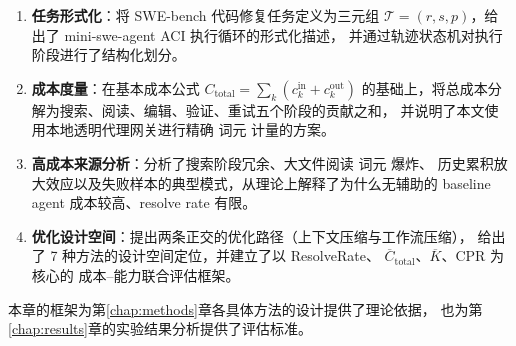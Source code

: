 \begin{enumerate}
  \item \textbf{任务形式化}：将 SWE-bench 代码修复任务定义为三元组
        $\mathcal{T} = (r, s, p)$，给出了 mini-swe-agent ACI 执行循环的形式化描述，
        并通过轨迹状态机对执行阶段进行了结构化划分。

  \item \textbf{成本度量}：在基本成本公式 $C_{\text{total}} = \sum_k (c_k^{\text{in}} + c_k^{\text{out}})$
        的基础上，将总成本分解为搜索、阅读、编辑、验证、重试五个阶段的贡献之和，
        并说明了本文使用本地透明代理网关进行精确 词元 计量的方案。

  \item \textbf{高成本来源分析}：分析了搜索阶段冗余、大文件阅读 词元 爆炸、
        历史累积放大效应以及失败样本的典型模式，从理论上解释了为什么无辅助的
        baseline agent 成本较高、resolve rate 有限。

  \item \textbf{优化设计空间}：提出两条正交的优化路径（上下文压缩与工作流压缩），
        给出了 7 种方法的设计空间定位，并建立了以 ResolveRate、
        $\overline{C}_{\text{total}}$、$\overline{K}$、CPR 为核心的
        成本--能力联合评估框架。
\end{enumerate}

本章的框架为第\ref{chap:methods}章各具体方法的设计提供了理论依据，
也为第\ref{chap:results}章的实验结果分析提供了评估标准。
